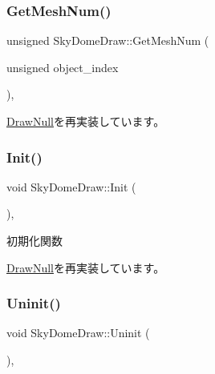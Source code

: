 \subsubsection{\texorpdfstring{Get\+Mesh\+Num()}{GetMeshNum()}}
{\footnotesize\ttfamily unsigned Sky\+Dome\+Draw\+::\+Get\+Mesh\+Num (\begin{DoxyParamCaption}\item[{unsigned}]{object\+\_\+index }\end{DoxyParamCaption})\hspace{0.3cm}{\ttfamily [override]}, {\ttfamily [virtual]}}



\mbox{\hyperlink{class_draw_null_ad735978a85a5f3583eecd82d6bfe6413}{Draw\+Null}}を再実装しています。

\mbox{\label{class_sky_dome_draw_a5b82e8b650a20dbc0b7ed720d1fb7fab}} 
\subsubsection{\texorpdfstring{Init()}{Init()}}
{\footnotesize\ttfamily void Sky\+Dome\+Draw\+::\+Init (\begin{DoxyParamCaption}{ }\end{DoxyParamCaption})\hspace{0.3cm}{\ttfamily [override]}, {\ttfamily [virtual]}}



初期化関数 



\mbox{\hyperlink{class_draw_null_acd7fef3ccea1da537ac9507ffbb6dd2e}{Draw\+Null}}を再実装しています。

\mbox{\label{class_sky_dome_draw_aee1c6b102a97033073b2559b8c2c328b}} 
\subsubsection{\texorpdfstring{Uninit()}{Uninit()}}
{\footnotesize\ttfamily void Sky\+Dome\+Draw\+::\+Uninit (\begin{DoxyParamCaption}{ }\end{DoxyParamCaption})\hspace{0.3cm}{\ttfamily [override]}, {\ttfamily [virtual]}}



